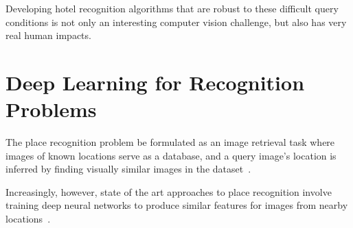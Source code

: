 Developing hotel recognition algorithms that are robust to these difficult query conditions is not only an interesting computer vision challenge, but also has very real human impacts.


\section{Deep Learning for Recognition Problems}
The place recognition problem be formulated as an image retrieval task where images of known locations serve as a database, and a query image's location is inferred by finding visually similar images in the dataset~\cite{baatz2012large,chen2011city,crandall2009mapping,hays2008im2gps,jacobs07geolocate,schindler2007city,torii2013visual,zamir2010accurate,googleLandmarks}.


Increasingly, however, state of the art approaches to place recognition involve training deep neural networks to produce similar features for images from nearby locations~\cite{zhou2014recognizing,netvlad,visualPlaceRecognition,vo2017revisit,zhai2018geotemporal}.

